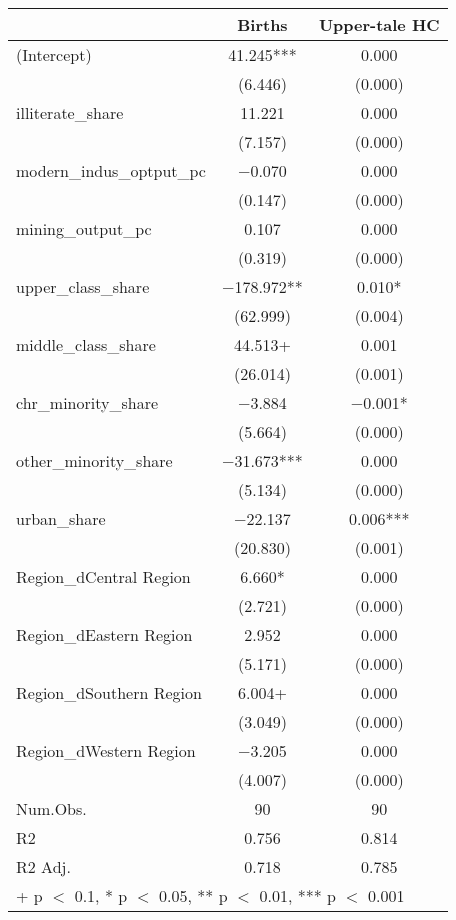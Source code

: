 \begin{table}
\centering
\begin{tabular}[t]{lcc}
\toprule
  & Births & Upper-tale HC\\
\midrule
(Intercept) & \num{41.245}*** & \num{0.000}\\
 & (\num{6.446}) & (\num{0.000})\\
illiterate\_share & \num{11.221} & \num{0.000}\\
 & (\num{7.157}) & (\num{0.000})\\
modern\_indus\_optput\_pc & \num{-0.070} & \num{0.000}\\
 & (\num{0.147}) & (\num{0.000})\\
mining\_output\_pc & \num{0.107} & \num{0.000}\\
 & (\num{0.319}) & (\num{0.000})\\
upper\_class\_share & \num{-178.972}** & \num{0.010}*\\
 & (\num{62.999}) & (\num{0.004})\\
middle\_class\_share & \num{44.513}+ & \num{0.001}\\
 & (\num{26.014}) & (\num{0.001})\\
chr\_minority\_share & \num{-3.884} & \num{-0.001}*\\
 & (\num{5.664}) & (\num{0.000})\\
other\_minority\_share & \num{-31.673}*** & \num{0.000}\\
 & (\num{5.134}) & (\num{0.000})\\
urban\_share & \num{-22.137} & \num{0.006}***\\
 & (\num{20.830}) & (\num{0.001})\\
Region\_dCentral Region & \num{6.660}* & \num{0.000}\\
 & (\num{2.721}) & (\num{0.000})\\
Region\_dEastern Region & \num{2.952} & \num{0.000}\\
 & (\num{5.171}) & (\num{0.000})\\
Region\_dSouthern Region & \num{6.004}+ & \num{0.000}\\
 & (\num{3.049}) & (\num{0.000})\\
Region\_dWestern Region & \num{-3.205} & \num{0.000}\\
 & (\num{4.007}) & (\num{0.000})\\
\midrule
Num.Obs. & \num{90} & \num{90}\\
R2 & \num{0.756} & \num{0.814}\\
R2 Adj. & \num{0.718} & \num{0.785}\\
\bottomrule
\multicolumn{3}{l}{\rule{0pt}{1em}+ p $<$ 0.1, * p $<$ 0.05, ** p $<$ 0.01, *** p $<$ 0.001}\\
\end{tabular}
\end{table}
